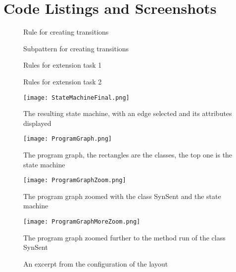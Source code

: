 \documentclass[copyright]{eptcs}
\begin{document}
\nocite{*}



\vspace{1cm}
\appendix
\section{Code Listings and Screenshots}
\begin{figure}[hb]
  
	\caption{Rule for creating transitions}
	\label{createtransitionrule.grg}
\end{figure}

\begin{figure}
  
	\caption{Subpattern for creating transitions}
	\label{createtransitionpattern.grg}
\end{figure}

\begin{figure}
  
	\caption{Rules for extension task 1}
	\label{extension1.grg}
\end{figure}

\begin{figure}
  
	\caption{Rules for extension task 2}
	\label{extension2.grg}
\end{figure}

\begin{figure}
\centering
\texttt{[image: StateMachineFinal.png]}
\caption{The resulting state machine, with an edge selected and its attributes displayed}
\label{fig:statemachine}
\end{figure}

\begin{figure}
\centering
\texttt{[image: ProgramGraph.png]}
\caption{The program graph, the rectangles are the classes, the top one is the state machine}
\label{fig:programgraph}
\end{figure}

\begin{figure}
\centering
\texttt{[image: ProgramGraphZoom.png]}
\caption{The program graph zoomed with the class SynSent and the state machine}
\label{fig:programgraphzoom}
\end{figure}

\begin{figure}
\centering
\texttt{[image: ProgramGraphMoreZoom.png]}
\caption{The program graph zoomed further to the method run of the class SynSent}
\label{fig:programgraphmorezoom}
\end{figure}


\begin{figure}

	\caption{An excerpt from the configuration of the layout}
	\label{layout.grsi}
\end{figure}

 
\end{document}
